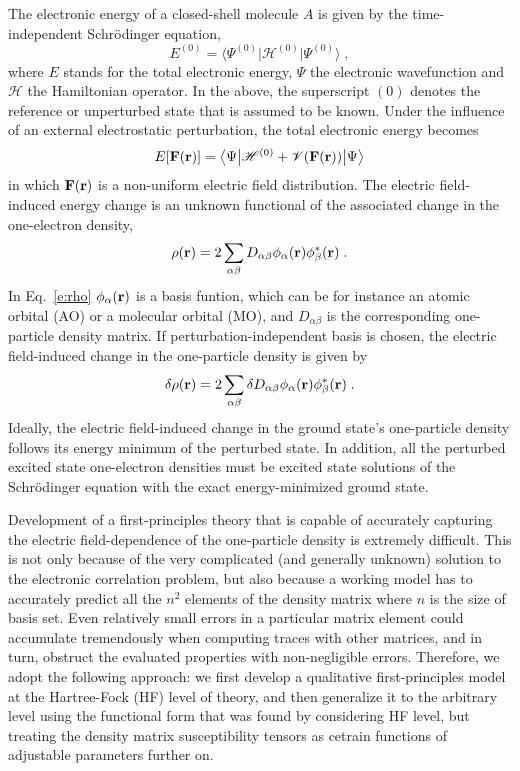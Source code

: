 \documentclass[aip,graphicx]{revtex4-1}
\newcommand{\tbraket}[3]{\ensuremath{\bigl\langle {#1} \bigl\lvert {#2} \bigl\lvert {#3} \bigr\rangle}}
\begin{document}
The electronic energy of a closed\hyp{}shell molecule $A$ is given by the time\hyp{}independent Schr{\"o}dinger equation,
%
\begin{equation}
 E^{(0)} = \tbraket{\Psi^{(0)}}{\mathscr{H}^{(0)}}{\Psi^{(0)}} \;,
\end{equation}
%
where $E$ stands for the total electronic energy, $\Psi$ the electronic wavefunction and $\mathscr{H}$
the Hamiltonian operator. In the above, the superscript $(0)$
denotes the reference or unperturbed state that is assumed to be known.
Under the influence of an external electrostatic perturbation, the total electronic energy
becomes
%
\begin{equation}
 E[{\bf F}({\bf r})] = \tbraket{\Psi}{\mathscr{H}^{(0)} + \mathscr{V}({\bf F}({\bf r}))}{\Psi}
\end{equation}
%
in which ${\bf F}({\bf r})$ is a non\hyp{}uniform electric field distribution.
The electric field\hyp{}induced energy change is an unknown functional 
of the associated change in the one\hyp{}electron density,
%
\begin{equation}\label{e:rho}
 \rho({\bf r}) = 2\sum_{\alpha\beta} D_{\alpha\beta} \phi_\alpha({\bf r}) \phi^*_\beta({\bf r}) \;.
\end{equation}
%
In Eq.~\eqref{e:rho} $\phi_\alpha({\bf r})$ is a basis funtion, which can be for instance 
an atomic orbital (AO) or a molecular orbital (MO), and $D_{\alpha\beta}$ is the corresponding
one\hyp{}particle density matrix.
If perturbation\hyp{}independent basis is chosen, the electric field\hyp{}induced change in the one\hyp{}particle density
is given by
%
\begin{equation}\label{e:rho}
 \delta \rho({\bf r}) = 2\sum_{\alpha\beta} \delta D_{\alpha\beta} \phi_\alpha({\bf r}) \phi^*_\beta({\bf r}) \;.
\end{equation}
%
Ideally, the electric field\hyp{}induced change in the ground state's one\hyp{}particle density 
follows its energy minimum of the perturbed state. In addition, all the perturbed 
excited state one\hyp{}electron densities must be excited state solutions of the Schr{\"o}dinger equation
with the exact energy\hyp{}minimized ground state. 

Development of a first\hyp{}principles theory
that is capable of accurately capturing the electric field\hyp{}dependence of the one\hyp{}particle density
is extremely difficult. This is not only because of the very complicated (and generally unknown) solution
to the electronic correlation problem, but also because
a working model has to accurately predict all the $n^2$ elements of the density matrix
where $n$ is the size of basis set. Even relatively small errors
in a particular matrix element could accumulate tremendously when computing traces with other matrices,
and in turn, obstruct the evaluated properties with non\hyp{}negligible errors.
Therefore, we adopt the following approach: we first develop a qualitative first\hyp{}principles model 
at the Hartree\hyp{}Fock (HF)
level of theory, and then generalize it to the arbitrary level using the functional form that was found 
by considering HF level,
but treating the density matrix susceptibility tensors as cetrain functions of adjustable parameters further on.
\end{document}
